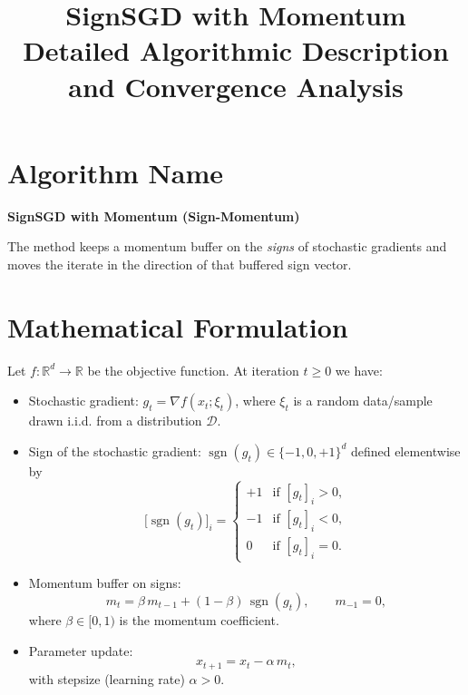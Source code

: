 \documentclass[11pt]{article}
\title{SignSGD with Momentum \\ Detailed Algorithmic Description and Convergence Analysis}
\author{}
\date{}
\begin{document}
\maketitle

\section*{Algorithm Name}
\textbf{SignSGD with Momentum (Sign-Momentum)}  

The method keeps a momentum buffer on the \emph{signs} of stochastic gradients and moves the iterate in the direction of that buffered sign vector.

\section*{Mathematical Formulation}
Let $f:\mathbb{R}^{d}\rightarrow\mathbb{R}$ be the objective function.  
At iteration $t\ge 0$ we have:

\begin{itemize}
    \item Stochastic gradient: $g_{t}= \nabla f(x_{t};\xi_{t})$, where $\xi_{t}$ is a random data/sample drawn i.i.d. from a distribution $\mathcal{D}$.
    \item Sign of the stochastic gradient: $\operatorname{sgn}(g_{t})\in\{-1,0,+1\}^{d}$ defined elementwise by
    \[
        \big[\operatorname{sgn}(g_{t})\big]_{i}= 
        \begin{cases}
            +1 & \text{if }[g_{t}]_{i}>0,\\
            -1 & \text{if }[g_{t}]_{i}<0,\\
            0  & \text{if }[g_{t}]_{i}=0 .
        \end{cases}
    \]
    \item Momentum buffer on signs:
    \[
        m_{t}= \beta\, m_{t-1} + (1-\beta)\,\operatorname{sgn}(g_{t}),\qquad m_{-1}=0,
    \]
    where $\beta\in[0,1)$ is the momentum coefficient.
    \item Parameter update:
    \[
        x_{t+1}= x_{t} - \alpha\,m_{t},
    \]
    with stepsize (learning rate) $\alpha>0$.
\end{itemize}
\end{document}
